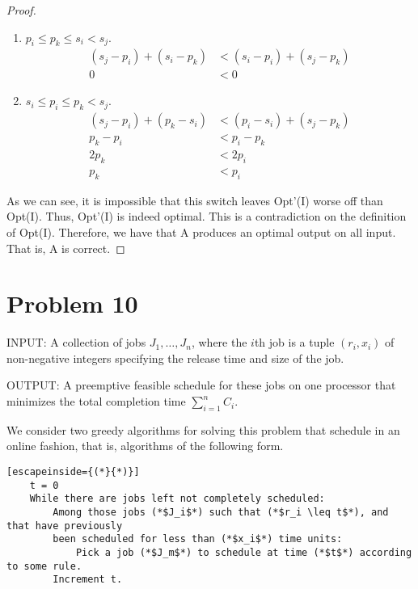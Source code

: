 \documentclass{article}
\providecommand{\prob}[1]{\section*{Problem #1}}
\begin{document}
\begin{enumerate}[label=(\alph*)]
\begin{proof}
\begin{enumerate}[label=Case \arabic*.]
                \item $ p_i \leq p_k \leq s_i < s_j $.
                \begin{align*}
                    (s_j - p_i) + (s_i - p_k) &< (s_i - p_i) + (s_j - p_k)\\
                    0 &< 0
                \end{align*}
                
                \item $ s_i \leq p_i \leq p_k < s_j $.
                \begin{align*}
                    (s_j - p_i) + (p_k - s_i) &< (p_i - s_i) + (s_j - p_k)\\
                    p_k - p_i &< p_i - p_k\\
                    2p_k &< 2p_i\\
                    p_k &< p_i
                \end{align*}
            \end{enumerate}
            
            As we can see, it is impossible that this switch leaves Opt'(I) worse off than Opt(I).
            Thus, Opt'(I) is indeed optimal.
            This is a contradiction on the definition of Opt(I).
            Therefore, we have that A produces an optimal output on all input.
            That is, A is correct.
        \end{proof}
    \end{enumerate}
    
    \prob{10}
    INPUT: A collection of jobs $J_1, \dots, J_n$, where the $i$th job is a tuple $(r_i, x_i)$ of non-negative integers specifying the release time and size of the job.
    
    OUTPUT: A preemptive feasible schedule for these jobs on one processor that minimizes the total completion time $\sum_{i=1}^{n} C_i$.
    
    We consider two greedy algorithms for solving this problem that schedule in an online fashion, that is, algorithms of the following form.
    \begin{lstlisting}[escapeinside={(*}{*)}]
    t = 0
    While there are jobs left not completely scheduled:
        Among those jobs (*$J_i$*) such that (*$r_i \leq t$*), and that have previously 
        been scheduled for less than (*$x_i$*) time units:
            Pick a job (*$J_m$*) to schedule at time (*$t$*) according to some rule.
        Increment t.
    \end{lstlisting}
    
\end{document}
